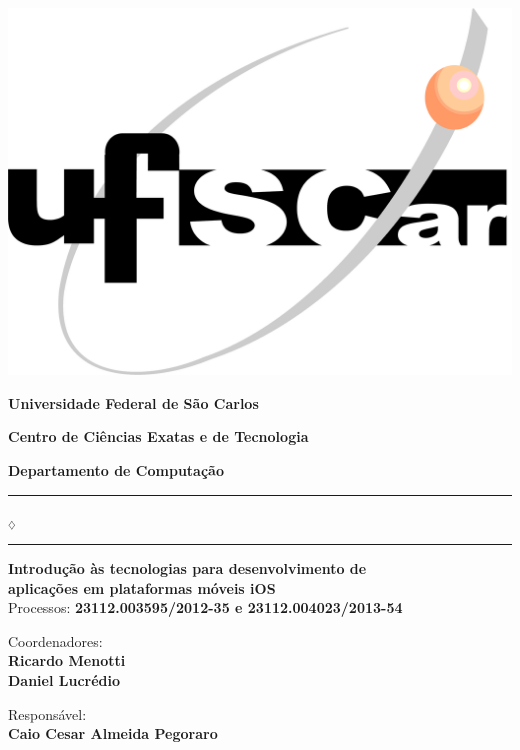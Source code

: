 
\begin{center}

\begin{minipage}[c]{\textwidth}
  \parbox[c]{3cm}{
      \begin{flushright}
      \includegraphics[width=.25\textwidth]{../figuras/LogoUfscar}
      \end{flushright}
  }
  \parbox[c]{12cm}
    {
      \begin{center}
      \textbf{\Large Universidade Federal de São Carlos}

      \vspace{0.07cm}

      \textbf{\large Centro de Ciências Exatas e de Tecnologia}

      \vspace{0.07cm}

      \textbf{\large Departamento de Computação}
      \vspace{0.07cm}
      \end{center}
    }
\end{minipage}

\vspace{-0.5cm}
\rule{7.5cm}{0.03pc}{\tiny $_\diamondsuit$}\rule{7.5cm}{0.03pc}

\vspace*{20ex}

\textbf{\Large {Introdução às tecnologias para desenvolvimento de \\ aplicações em plataformas móveis iOS}} \\
\large{ Processos: \textbf{23112.003595/2012-35 e 23112.004023/2013-54}}

\vspace*{5ex}

{\Large{ Coordenadores:  }} \\
\textbf{\Large{ Ricardo Menotti}} \\
\textbf{\Large{ Daniel Lucrédio}}

\vspace*{5ex}

{\Large{ Responsável:  }}  \\
\textbf{\Large{ Caio Cesar Almeida Pegoraro }}  \\


\end{center}
